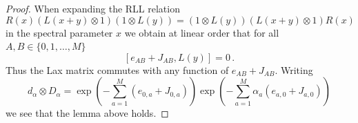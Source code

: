 \documentclass[11pt]{article}
\numberwithin{equation}{section}
\newcommand{\M}{M}
\newcommand{\fundR}{R}
\begin{document}
\begin{proof}
When expanding  the RLL relation
\begin{equation}
		\fundR(x)(L(x+y)\otimes1)(1\otimes L(y))=(1\otimes L(y))(L(x+y)\otimes1)\fundR(x)
	\end{equation}
in the spectral parameter $x$ we obtain at linear order that for all $A,B\in \{0,1,\ldots,\M\}$
\begin{equation}
	\left[e_{AB}+J_{AB},L(y)\right]=0\,.
\end{equation}
Thus the Lax matrix commutes with any function of $e_{AB}+J_{AB}$. Writing
 \begin{equation}
  d_\alpha\otimes D_\alpha=\exp{\left(-\sum_{ a=1}^{\M}(e_{0,a}+J_{0,a})\right)}\exp{\left(-\sum_{a=1}^{\M}\alpha_{a}(e_{a,0}+J_{a,0})\right)}
 \end{equation}
 we see that the lemma above holds.
\end{proof}
\end{document}
